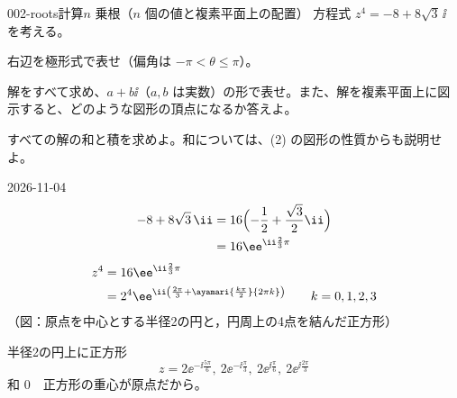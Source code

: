 \documentclass[uplatex,dvipdfmx,a4paper,11pt]{jsarticle}
\begin{document}
\begin{mondai}{002-roots}{計算}{$n$ 乗根（$n$ 個の値と複素平面上の配置）}
方程式 $z^{4}=-8+8\sqrt{3}\,\ii$ を考える。
  \begin{shoumon}
    \item 右辺を極形式で表せ（偏角は $-\pi<\theta\le\pi$）。
    \item 解をすべて求め、$a+b\ii$（$a,b$ は実数）の形で表せ。また、解を複素平面上に図示すると、どのような図形の頂点になるか答えよ。
    \item すべての解の和と積を求めよ。和については、(2) の図形の性質からも説明せよ。
  \end{shoumon}
\begin{kotaeutsushi}{2026-11-04}
\begin{align*}
-8+8\sqrt{3}\,\ii&=16\Bigl(-\frac{1}{2}+\frac{\sqrt{3}}{2}\ii\Bigr)\\
&=16\ee^{\ii\frac{2}{3}\pi}
\end{align*}
\begin{align*}
z^{4}&=16\ee^{\ii\frac{2}{3}\pi}\\
&=2^{4}\ee^{\ii\left(\frac{2\pi}{3}+\ayamari{\frac{k\pi}{2}}{2\pi k}\right)}\qquad k=0,1,2,3
\end{align*}
（図：原点を中心とする半径2の円と，円周上の4点を結んだ正方形）

半径2の円上に正方形
\[ z=2\ee^{-\ii\frac{5\pi}{6}},\ 2\ee^{-\ii\frac{\pi}{3}},\ 2\ee^{\ii\frac{\pi}{6}},\ 2\ee^{\ii\frac{2\pi}{3}} \]
和 $0$　正方形の重心が原点だから。


\end{kotaeutsushi}
\end{mondai}
\end{document}
